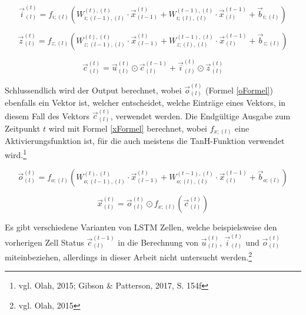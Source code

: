 \documentclass[
	a4paper,
	12pt,
	ngerman,
	oneside
]{scrreprt}											%
\begin{document}
				
				\begin{equation}\label{iFormel}
					\vec{i}_{(l)}^{(t)} = f_{i;(l)} \left( W_{i; (l-1),(l)}^{(t),(t)} \cdot \vec{x}_{(l-1)}^{(t)} + W_{i; (l),(l)}^{(t-1),(t)} \cdot \vec{x}_{(l)}^{(t-1)} + \vec{b}_{i; (l)} \right)
				\end{equation}
				
				\begin{equation}\label{zFormel}
					\vec{z}_{(l)}^{(t)} = f_{z; (l)} \left( W_{z; (l-1),(l)}^{(t),(t)} \cdot \vec{x}_{(l-1)}^{(t)} + W_{z; (l),(l)}^{(t-1),(t)} \cdot \vec{x}_{(l)}^{(t-1)} + \vec{b}_{z; (l)} \right)
				\end{equation}
				
				\begin{equation}\label{ZFormel}
					\vec{c}_{(l)}^{(t)} = \vec{u}_{(l)}^{(t)} \odot \vec{c}_{(l)}^{(t-1)} + \vec{i}_{(l)}^{(t)} \odot \vec{z}_{(l)}^{(t)}
				\end{equation}
				
				Schlussendlich wird der Output berechnet, wobei $\vec{o}_{(l)}^{(t)}$ (Formel \ref{oFormel}) ebenfalls ein Vektor ist, welcher entscheidet, welche Einträge eines Vektors, in diesem Fall des Vektors $\vec{c}_{(l)}^{(t)}$, verwendet werden. Die Endgültige Ausgabe zum Zeitpunkt $t$ wird mit Formel \ref{xFormel} berechnet, wobei $f_{x;(l)}$ eine Aktivierungsfunktion ist, für die auch meistens die TanH-Funktion verwendet wird.\footnote{vgl. Olah, 2015; Gibson \& Patterson, 2017, S. 154f} 
				
				\begin{equation}\label{oFormel}
					\vec{o}_{(l)}^{(t)} = f_{o;(l)} \left( W_{o; (l-1),(l)}^{(t),(t)} \cdot \vec{x}_{(l-1)}^{(t)} + W_{o; (l),(l)}^{(t-1),(t)} \cdot \vec{x}_{(l)}^{(t-1)} + \vec{b}_{o; (l)} \right)
				\end{equation}
				
				\begin{equation}\label{xFormel}
					\vec{x}_{(l)}^{(t)} = \vec{o}_{(l)}^{(t)} \odot f_{x; (l)}(\vec{c}_{(l)}^{(t)})
				\end{equation}
				
				Es gibt verschiedene Varianten von LSTM Zellen, welche beispielsweise den vorherigen Zell Status $\vec{c}_{(l)}^{(t-1)}$ in die Berechnung von $\vec{u}_{(l)}^{(t)}$, $\vec{i}_{(l)}^{(t)}$ und $\vec{o}_{(l)}^{(t)}$ miteinbeziehen, allerdings in dieser Arbeit nicht untersucht werden.\footnote{vgl. Olah, 2015}
				
\end{document}
